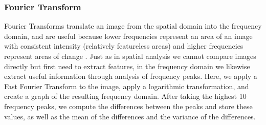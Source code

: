 
\subsubsection{Fourier Transform}

Fourier Transforms translate an image from the spatial domain into the frequency domain, and are useful because lower frequencies represent an area of an image with consistent intensity (relatively featureless areas) and higher frequencies represent areas of change \cite{Haas_2011}.  Just as in spatial analysis we cannot compare images directly but first need to extract features, in the frequency domain we likewise extract useful information through analysis of frequency peaks. Here, we apply a Fast Fourier Transform to the image, apply a logarithmic transformation, and create a graph of the resulting frequency domain. After taking the highest 10 frequency peaks, we compute the differences between the peaks and store these values, as well as the mean of the differences and the variance of the differences. 

    
  
  
  